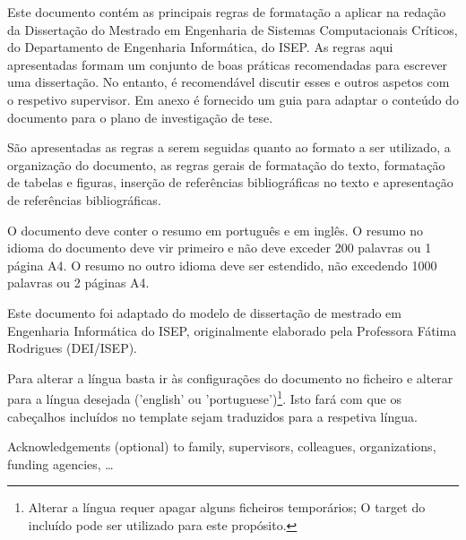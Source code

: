\begin{abstractotherlanguage}

Este documento contém as principais regras de formatação a aplicar na redação da Dissertação do Mestrado em Engenharia de Sistemas Computacionais Críticos, do Departamento de Engenharia Informática, do ISEP. As regras aqui apresentadas formam um conjunto de boas práticas recomendadas para escrever uma dissertação. No entanto, é recomendável discutir esses e outros aspetos com o respetivo supervisor. Em anexo é fornecido um guia para adaptar o conteúdo do documento para o plano de investigação de tese.

São apresentadas as regras a serem seguidas quanto ao formato a ser utilizado, a organização do documento, as regras gerais de formatação do texto, formatação de tabelas e figuras, inserção de referências bibliográficas no texto e apresentação de referências bibliográficas.

O documento deve conter o resumo em português e em inglês. O resumo no idioma do documento deve vir primeiro e não deve exceder 200 palavras ou 1 página A4. O resumo no outro idioma deve ser estendido, não excedendo 1000 palavras ou 2 páginas A4.

Este documento foi adaptado do modelo de dissertação de mestrado em Engenharia Informática do ISEP, originalmente elaborado pela Professora Fátima Rodrigues (DEI/ISEP).

Para alterar a língua basta ir às configurações do documento no ficheiro  e alterar para a língua desejada ('english' ou 'portuguese')\footnote{Alterar a língua requer apagar alguns ficheiros temporários; O target  do  incluído pode ser utilizado para este propósito.}. Isto fará com que os cabeçalhos incluídos no template sejam traduzidos para a respetiva língua.

\end{abstractotherlanguage}



\begin{acknowledgements}

Acknowledgements (optional) to family, supervisors, colleagues, organizations, funding agencies, …

\end{acknowledgements}


